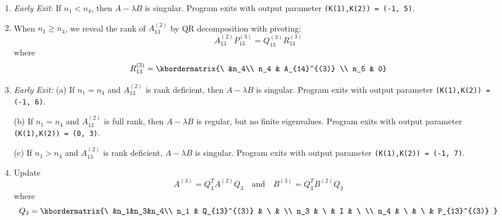 \documentclass[11pt]{article}
\begin{document}
\begin{itemize}
\begin{enumerate}
\item {\em Early Exit}:  
If $n_1 < n_4$, then $A-\lambda B$ is singular. 
Program exits with output parameter 
    {\tt (K(1),K(2)) = (-1, 5)}.

\item When $n_1 \geq n_4$,
we reveal the rank of $A_{13}^{(2)}$ 
by QR decomposition with pivoting:
\begin{equation*}
A_{13}^{(2)}P_{13}^{(3)}=Q_{13}^{(3)}R_{13}^{(3)}
\end{equation*}
where
\begin{equation*}
R_{13}^{(3)}
=\kbordermatrix{\ &n_4\\
n_4 & A_{14}^{(3)} \\
n_5 & 0}
\end{equation*}

\item  {\em Early Exit:}  
(a) 
If $n_1 = n_4$ and $A_{13}^{(2)}$ is rank deficient, 
then $A-\lambda B$ is singular. Program exits with output parameter 
    {\tt (K(1),K(2)) = (-1, 6)}.

(b) 
If $n_1 = n_4$ and $A_{13}^{(2)}$ is full rank, then $A-\lambda B$ is 
regular, but no finite eigenvalues. Program exits with output parameter 
    {\tt (K(1),K(2)) = (0, 3)}.  

(c) 
If $n_1 > n_4$ and $A_{13}^{(2)}$ is rank deficient, 
$A - \lambda B$ is singular. Program exits with output parameter 
    {\tt (K(1),K(2)) = (-1, 7)}. 

\item  Update 
\[ 
A^{(3)}=Q_3^{T}A^{(2)}Q_3
\quad \mbox{and} \quad 
B^{(3)}=Q_3^{T}B^{(2)}Q_3
\] 
where 
\begin{equation*}
Q_3
=\kbordermatrix{\ &n_1&n_3&n_4\\
n_1 & Q_{13}^{(3)} & \ & \\
n_3 & \ & I & \ \\
n_4 & \ & \ & P_{13}^{(3)} }
\end{equation*}


\end{enumerate}
\end{itemize}
\end{document}
